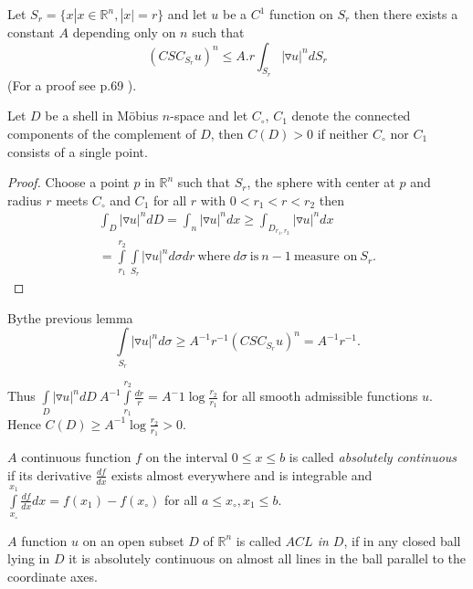 \begin{lemma} \label{chap10:lem10.3}
  Let $S_r = \{ x | x \in \mathbb{R}^n, |x|=r \}$ and let $u$ be a
  $C^1$ function on $S_r$ then there exists a constant $A$ depending
  only on $n$ such that
  $$
  (CSC_{S_r}u)^n \leq A. r \int_{S_r} |\triangledown u|^n d S_r
  $$
  (For a proof see p.69 \cite{17}).
\end{lemma}

\begin{lemma}[Loewner] \label{chap10:lem10.4}
  Let $D$ be a shell in M\"obius $n$-space and let $C_\circ$, $C_1$
  denote the connected components of the complement of $D$, then
  $C(D)>0$ if neither $C_\circ$ nor $C_1$ consists of a single point.
\end{lemma}

\begin{proof}
  Choose a point $p$ in $\mathbb{R}^n$ such that $S_r$, the sphere
  with center at $p$ and radius $r$ meets $C_\circ$ and $C_1$ for all
  $r$ with $0< r_1 < r < r_2$ then
  \begin{multline*}
    \int_D |\triangledown u|^n d D = \int_n |\triangledown u|^n dx
    \geq \int_{D_{r_1, r_2}} |\triangledown u|^n dx\\
    = \int\limits^{r_2}_{r_1} \int\limits_{S_r} |\triangledown u|^n d
    \sigma dr ~\text{where}~ d \sigma ~\text{is}~ n-1 ~\text{measure
      on}~ S_r.
  \end{multline*}
\end{proof}

By\pageoriginale the previous lemma
$$
\int\limits_{S_r} |\triangledown u|^n d \sigma \geq A^{-1} r^{-1}
(CSC_{S_r} u)^n = A^{-1} r^{-1}.
$$

Thus $\int\limits_D |\triangledown u|^n dD~ A^{-1}
\int\limits_{r_1}^{r_2} \frac{dr}{r} = A^-1 \log \frac{r_2}{r_1}$ for
  all smooth admissible functions $u$. Hence $C(D)\geq A^{-1} \log
  \frac{r_2}{r_1} > 0$.

\begin{defi*}
  $A$ continuous function $f$ on the interval $0 \leq x \leq b$ is
  called \textit{absolutely continuous} if its derivative
  $\frac{df}{dx}$ exists almost everywhere and is integrable and
  $\int\limits_{x_\circ}^{x_1} \frac{df}{dx} dx= f(x_1)- f(x_\circ)$
  for all $a \leq x_\circ, x_1 \leq b$.
\end{defi*}

$A$ function $u$ on an open subset $D$ of $\mathbb{R}^n$ is called
\textit{$ACL$ in $D$}, if in any closed ball lying in $D$ it is
absolutely continuous on almost all lines in the ball parallel to the
coordinate axes.

